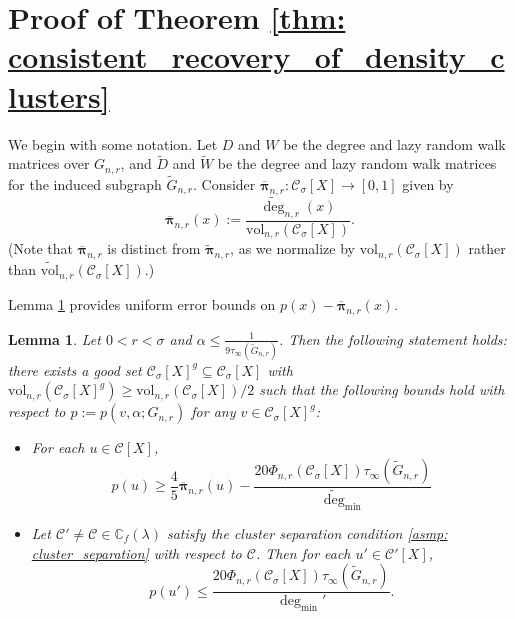\documentclass[11pt,twoside]{article}
\newtheorem{lemma}{Lemma}
\newcommand{\vol}{\mathrm{vol}}
\newcommand{\1}{\mathbf{1}}
\newcommand{\pbf}{p}        %
\newcommand{\pibf}{\bm{\pi}}
\newcommand{\Xbf}{X}             %
\newcommand{\Wbf}{W}
\newcommand{\Dbf}{D}
\newcommand{\Cbb}{\mathbb{C}}
\newcommand{\Cset}{\mathcal{C}}
\newcommand{\Csig}{\Cset_{\sigma}}
\newcommand{\degminpr}{\deg_{\min}'}
\newcommand{\degminwt}{\widetilde{\deg}_{\min}}
\begin{document}
\section{Proof of Theorem \ref{thm: consistent_recovery_of_density_clusters}}
\label{sec: proof_of_consistent_cluster_recovery}

We begin with some notation. Let $\Dbf$ and $\Wbf$ be the degree and lazy random walk matrices over $G_{n,r}$, and $\widetilde{\Dbf}$ and $\widetilde{\Wbf}$ be the degree and lazy random walk matrices for the induced subgraph $\widetilde{G}_{n,r}$. Consider $\overline{\pibf}_{n,r}: \Csig[\Xbf] \to [0,1]$ given by
\begin{equation*}
\overline{\pibf}_{n,r}(x) := \frac{\widetilde{\deg}_{n,r}(x)}{\vol_{n,r}(\Csig[\Xbf])}.
\end{equation*}
(Note that $\overline{\pibf}_{n,r}$ is distinct from $\widetilde{\pibf}_{n,r}$, as we normalize by $\vol_{n,r}(\Csig[\Xbf])$ rather than $\widetilde{\vol}_{n,r}(\Csig[\Xbf])$.)

Lemma \ref{lem: setup} provides uniform error bounds on $\pbf(x) - \overline{\pibf}_{n,r}(x)$. 

\begin{lemma} 
	\label{lem: setup}
	Let $0 < r < \sigma$ and $\alpha \leq \frac{1}{9 \tau_{\infty}(\widetilde{G}_{n,r})}$. Then the following statement holds: there exists a good set $\Csig[\Xbf]^g \subseteq \Csig[\Xbf]$ with $\vol_{n,r}(\Csig[\Xbf]^g) \geq \vol_{n,r}(\Csig[\Xbf])/2$ such that the following bounds hold with respect to $\pbf := \pbf(v,\alpha;G_{n,r})$ for any $v \in \Csig[\Xbf]^g$:
	\begin{itemize}
		\item For each $u \in \Cset[\Xbf]$,
		\begin{equation}
		\label{eqn: lower_bound_PPR_in_cluster}
		\pbf(u) \geq \frac{4}{5} \overline{\pibf}_{n,r}(u) - \frac{20 \Phi_{n,r}(\Csig[\Xbf]) \tau_{\infty}(\widetilde{G}_{n,r})}{\degminwt}
		\end{equation}
		\item Let $\Cset' \neq \Cset \in \Cbb_f(\lambda)$ satisfy the cluster separation condition \ref{asmp: cluster_separation} with respect to $\Cset$. Then for each $u' \in \Cset'[\Xbf]$,
		\begin{equation}
		\label{eqn: upper_bound_PPR_in_other_cluster}
		\pbf(u') \leq \frac{20 \Phi_{n,r}(\Csig[\Xbf]) \tau_{\infty}(\widetilde{G}_{n,r})}{\degminpr}.
		\end{equation}
	\end{itemize}
\end{lemma}
\end{document}
